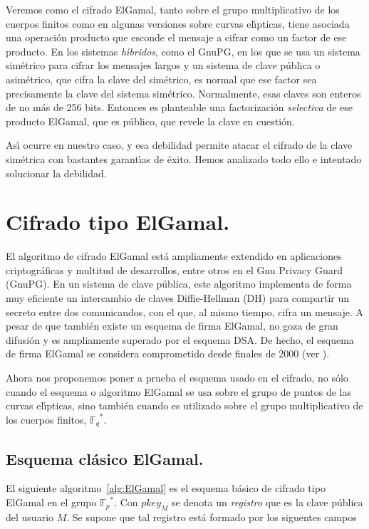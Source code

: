 \documentclass{llncs}
\def\ces{curvas{} el\'{\i}pticas}%
\newcommand{\Fp}{\ensuremath{\mathbb{F}_p}}%
\newcommand{\Fq}{\ensuremath{\mathbb{F}_q}}%
\theoremstyle{plain}        			%
\theoremstyle{definition}   			%
\theoremstyle{saltolinea}   			%
\begin{document}
Veremos como el cifrado ElGamal, tanto sobre el grupo multiplicativo de los cuerpos finitos como en algunas versiones sobre \ces{}, tiene asociada una operaci\'on producto que esconde el mensaje a cifrar como un factor de ese producto. En los sistemas \emph{h\'{\i}bridos}, como el GnuPG, en los que se usa un sistema sim\'etrico para cifrar los mensajes largos y un sistema de clave p\'ublica o asim\'etrico, que cifra la clave del sim\'etrico, es normal que ese factor sea precisamente la clave del sistema sim\'etrico. Normalmente, esas claves son enteros de no m\'as de 256 bits. Entonces es planteable una factorizaci\'on \emph{selectiva} de ese producto ElGamal, que es p\'ublico, que revele la clave en cuesti\'on.

As\'{\i} ocurre en nuestro caso, y esa debilidad permite atacar el cifrado de la clave sim\'etrica con bastantes garant\'{\i}as de \'exito. Hemos analizado todo ello e intentado solucionar la debilidad.

\section{Cifrado tipo ElGamal.} %

El algoritmo de cifrado ElGamal est\'a ampliamente extendido en aplicaciones criptogr\'aficas y multitud de desarrollos, entre otros en el Gnu Privacy Guard (GnuPG). En un sistema de clave p\'ublica, este algoritmo implementa de forma muy eficiente un intercambio de claves Diffie-Hellman (DH) para compartir un secreto entre dos comunicandos, con el que, al mismo tiempo, cifra un mensaje. A pesar de que tambi\'en existe un esquema de firma ElGamal, no goza de gran difusi\'on y es ampliamente superado por el esquema DSA. De hecho, el esquema de firma ElGamal se considera comprometido desde finales de 2000 (ver \cite{insecure}).

Ahora nos proponemos poner a prueba el esquema usado en el cifrado, no s\'olo cuando el esquema o algoritmo ElGamal se usa sobre el grupo de puntos de las {\ces}, sino tambi\'en cuando es utilizado sobre el grupo multiplicativo de los cuerpos finitos, $\Fq^*$.

\subsection{Esquema cl\'asico ElGamal.}

El siguiente algoritmo~\ref{alg:ElGamal} es el esquema b\'asico de cifrado tipo ElGamal en el grupo $\Fp^*$. Con $pkey_M$ se denota un \emph{registro} que es la clave p\'ublica del usuario $M$. Se supone que tal registro est\'a formado por los siguentes campos
\end{document}

